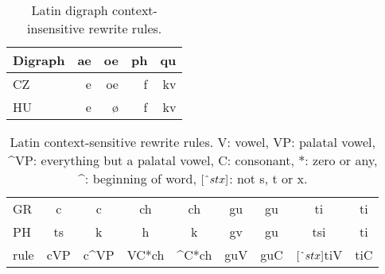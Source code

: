 \documentclass[runningheads,a4paper]{llncs}
\begin{document}
\begin{table}
	\centering
	\caption{Latin digraph context-insensitive rewrite rules.}\label{tbl:digraph}
	\begin{tabular}{l|rrrr}
	\hline
	Digraph & ae & oe & ph & qu \\
	\hline
	CZ & e & oe & f & kv \\
	HU & e & \o & f & kv \\
	\hline
	\end{tabular}
\end{table}

\begin{table}
	\centering
	\caption{Latin context-sensitive rewrite rules. V: vowel, VP: palatal vowel, \string^VP: everything but a palatal vowel, C: consonant, $*$: zero or any, \string^: beginning of word, $[\string^stx]$: not s, t or x.}\label{tbl:context}
	\begin{tabular}{l|cc|cc|cc|cc}
	\hline
	GR & c & c & ch & ch & gu & gu & ti & ti \\
	PH & ts & k & h & k & gv & gu & tsi & ti \\
	\hline
	rule & \multicolumn{1}{c|}{cVP} & \multicolumn{1}{c|}{c\string^VP} & \multicolumn{1}{c|}{VC*ch} & \multicolumn{1}{c|}{\string^C*ch} & \multicolumn{1}{c|}{guV} & \multicolumn{1}{c|}{guC} & \multicolumn{1}{c|}{$[\string^stx]$tiV} & \multicolumn{1}{c|}{tiC} \\
	\hline
	\end{tabular}
\end{table}
\end{document}
